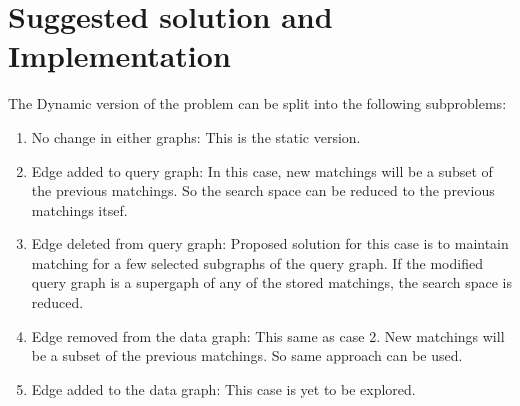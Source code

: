 \documentclass[
10pt, %
a4paper, %
oneside, %
headinclude,footinclude, %
BCOR5mm, %
]{scrartcl}
\begin{document}




\section{Suggested solution and Implementation}

The Dynamic version of the problem can be split into the following subproblems:

\begin{enumerate}
    \item No change in either graphs: This is the static version.
    \item Edge added to query graph: In this case, new matchings will be a subset of the previous matchings. So the search space can be reduced to the previous matchings itsef.
    \item Edge deleted from query graph: Proposed solution for this case is to maintain matching for a few selected subgraphs of the query graph. If the modified query graph is a supergaph of any of the stored matchings, the search space is reduced.
    \item Edge removed from the data graph: This same as case 2. New matchings will be a subset of the previous matchings. So same approach can be used.
    \item Edge added to the data graph: This case is yet to be explored.
\end{enumerate}

\renewcommand{\refname}{\spacedlowsmallcaps{References}} %


\end{document}
